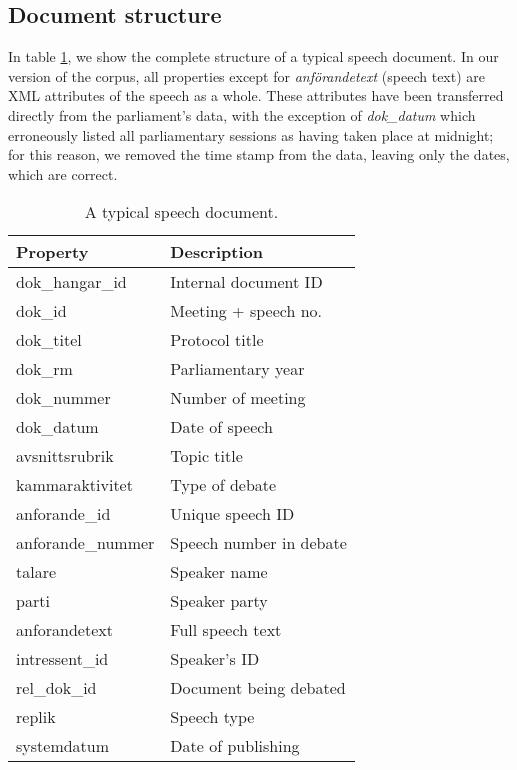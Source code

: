 \subsection{Document structure}

In table \ref{anf-table}, we show the complete structure of a typical speech document. In our version of the corpus, all properties except for \emph{anförandetext} (speech text) are XML attributes of the speech as a whole. These attributes have been transferred directly from the parliament's data, with the exception of \emph{dok\_datum} which erroneously listed all parliamentary sessions as having taken place at midnight; for this reason, we removed the time stamp from the data, leaving only the dates, which are correct.

\begin{table}[ht!]
\begin{center}
\begin{tabular}{|l|l|}
\hline \textbf{Property} & \textbf{Description} \\ \hline
dok\_hangar\_id & Internal document ID \\
dok\_id  & Meeting + speech no. \\
dok\_titel & Protocol title \\
dok\_rm & Parliamentary year \\
dok\_nummer & Number of meeting \\
dok\_datum & Date of speech \\
avsnittsrubrik & Topic title \\
kammaraktivitet & Type of debate \\
anforande\_id & Unique speech ID \\
anforande\_nummer & Speech number in debate \\
talare & Speaker name \\
parti & Speaker party \\
anforandetext & Full speech text \\
intressent\_id & Speaker's ID \\
rel\_dok\_id & Document being debated \\
replik & Speech type \\
systemdatum & Date of publishing \\
\hline
\end{tabular}
\end{center}
\caption{\label{anf-table} A typical speech document. }
\end{table}

